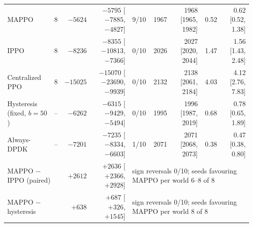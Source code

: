 \begin{table}[!t]
\begin{tabular}{@{}lcrrcrrrr@{}}
MAPPO & 8 & $-5624$ & $-5795$ [$-7885$, $-4827$] & 9/10 & 1967 & 1968 [1965, 1982] & 0.52 & 0.62 [0.52, 1.38] \\
IPPO & 8 & $-8236$ & $-8355$ [$-10813$, $-7366$] & 0/10 & 2026 & 2027 [2020, 2044] & 1.47 & 1.56 [1.43, 2.48] \\
Centralized PPO & 8 & $-15025$ & $-15070$ [$-23690$, $-9939$] & 0/10 & 2132 & 2138 [2061, 2184] & 4.03 & 4.12 [2.76, 7.83] \\
Hysteresis (fixed, $b{=}50$) & -- & $-6262$ & $-6315$ [$-9429$, $-5494$] & 0/10 & 1995 & 1996 [1987, 2019] & 0.68 & 0.78 [0.65, 1.89] \\
Always-DPDK & -- & $-7201$ & $-7235$ [$-8334$, $-6603$] & 1/10 & 2071 & 2071 [2068, 2073] & 0.38 & 0.47 [0.38, 0.80] \\
\multicolumn{2}{l}{MAPPO $-$ IPPO (paired)} & $+2612$ & $+2636$ [$+2366$, $+2928$] & \multicolumn{5}{l}{sign reversals 0/10; seeds favouring MAPPO per world 6--8 of 8} \\
\multicolumn{2}{l}{MAPPO $-$ hysteresis} & $+638$ & $+687$ [$+326$, $+1545$] & \multicolumn{5}{l}{sign reversals 0/10; seeds favouring MAPPO per world 8 of 8} \\
\bottomrule
\end{tabular}
\par{}
\end{table}
